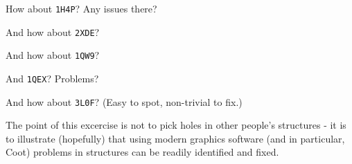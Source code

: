 \documentclass{article}
\begin{document}
How about \texttt{1H4P}?  Any issues there?

And how about \texttt{2XDE}? %

And how about \texttt{1QW9}?

And \texttt{1QEX}?  Problems?

And how about \texttt{3L0F}? (Easy to spot, non-trivial to
fix.) %




The point of this excercise is not to pick holes in other people's
structures - it is to illustrate (hopefully) that using modern
graphics software (and in particular, Coot) problems in structures can
be readily identified and fixed.  

\end{document}
